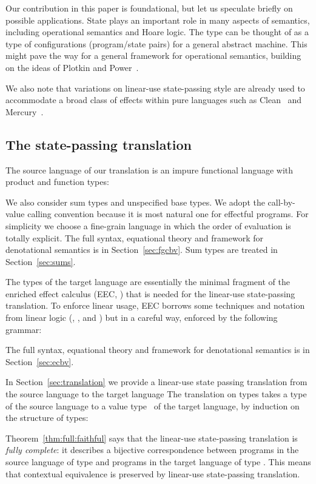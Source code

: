 \documentclass{LMCS}
\begin{document}
Our contribution in this paper is foundational,
but let us speculate briefly on possible applications.
State plays an important role in many aspects of semantics,
including operational semantics and Hoare
logic.  
The type  can be thought of as a type of 
configurations (program/state pairs) 
for a general abstract machine.
This might pave the way for a general framework for operational semantics, 
building 
on the ideas of Plotkin and Power~\cite{Plotkin:Power:08}.

We also note that variations on linear-use state-passing style
are already used to accommodate a broad class of effects 
within pure languages such as Clean~\cite{DBLP:journals/jfp/AchtenP95} and Mercury~\cite{DBLP:journals/jlp/SomogyiHC96}.

\subsection{The state-passing translation}
The source language of our translation is an impure functional
language with
product and function types:

We also consider sum types and unspecified base types.
We adopt the 
call-by-value calling convention because it is 
most natural one for effectful programs.
For simplicity we choose a fine-grain language
in which the order of evaluation is totally explicit.
The full syntax, equational theory
and framework for denotational semantics is in Section~\ref{sec:fgcbv}.
Sum types are treated in Section~\ref{sec:sums}.

The types of the target language are essentially the minimal
fragment of the enriched effect calculus (EEC, \cite{Mogelberg:CSL:09,EEC:journal}) 
that is 
needed for the linear-use state-passing translation.
To enforce linear usage, EEC borrows some techniques and notation
from linear logic (, , and )
but in a careful way, enforced by the following grammar:

The full syntax, equational theory
and framework for denotational semantics is in 
Section~\ref{sec:ecbv}.

In Section~\ref{sec:translation}
we provide a linear-use state passing translation
from the source language to the target language
The translation on types 
takes a type  
of the source language to a value type~ of the target language, by induction on the structure of types:

Theorem~\ref{thm:full:faithful} says that 
the linear-use state-passing translation is \emph{fully complete}:
it describes a bijective correspondence between
programs in the source language of type  
and programs in the target language of type .
This means that contextual equivalence is preserved by 
linear-use state-passing translation.
\end{document}
